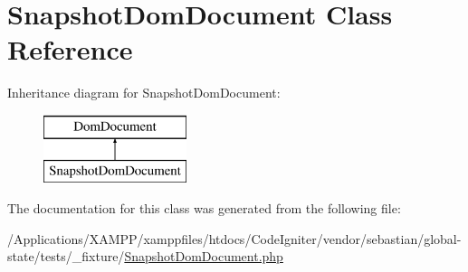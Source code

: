 \hypertarget{class_sebastian_bergmann_1_1_global_state_1_1_test_fixture_1_1_snapshot_dom_document}{}\section{Snapshot\+Dom\+Document Class Reference}
\label{class_sebastian_bergmann_1_1_global_state_1_1_test_fixture_1_1_snapshot_dom_document}
Inheritance diagram for Snapshot\+Dom\+Document\+:\begin{figure}[H]
\begin{center}
\leavevmode
\includegraphics[height=2.000000cm]{class_sebastian_bergmann_1_1_global_state_1_1_test_fixture_1_1_snapshot_dom_document}
\end{center}
\end{figure}


The documentation for this class was generated from the following file\+:\begin{DoxyCompactItemize}
\item 
/\+Applications/\+X\+A\+M\+P\+P/xamppfiles/htdocs/\+Code\+Igniter/vendor/sebastian/global-\/state/tests/\+\_\+fixture/\mbox{\hyperlink{_snapshot_dom_document_8php}{Snapshot\+Dom\+Document.\+php}}\end{DoxyCompactItemize}
